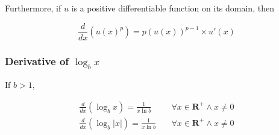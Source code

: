Furthermore, if $u$ is a positive differentiable function on its domain, then

\begin{equation}
\frac{d}{dx}(u(x)^p) = p(u(x))^{p - 1} \times u'(x)
\end{equation}

\subsubsection{Derivative of $\log _b x$}
If $b > 1$,

\begin{align}
\frac{d}{dx}(\log _b x) = \frac{1}{x \ln b} &\quad \forall x \in \mathbf{R}^+ \wedge x \neq 0 \\
\frac{d}{dx}(\log _b | x |) = \frac{1}{x \ln b} &\quad \forall x \in \mathbf{R}^+ \wedge x \neq 0
\end{align}
